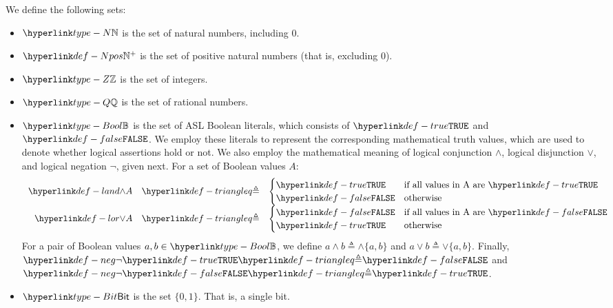 We define the following sets:
\begin{itemize}
\item
\hypertarget{type-N}{}
$\N$
is the set of natural numbers, including $0$.

\item \hypertarget{def-Npos}{
    $\Npos$ is the set of positive natural numbers (that is, excluding $0$).
}

\item
\hypertarget{type-Z}{}
$\Z$
is the set of integers.

\item
\hypertarget{type-Q}{}
$\Q$
is the set of rational numbers.

\hypertarget{def-false}{}
\hypertarget{def-true}{}
\item
\hypertarget{type-Bool}{}
$\Bool$
is the set of ASL Boolean literals, which consists of $\True$ and $\False$.
We employ these literals to represent the corresponding mathematical truth values,
which are used to denote whether logical assertions hold or not.
\hypertarget{def-land}{}
\hypertarget{def-lor}{}
We also employ the mathematical meaning of logical conjunction $\land$, logical disjunction $\lor$,
and logical negation $\neg$, given next.
For a set of Boolean values $A$:
\[
  \begin{array}{rcl}
  \land A &\triangleq&
  \begin{cases}
    \True & \text{if all values in A are }\True\\
    \False & \text{otherwise}
  \end{cases}\\
  \lor A &\triangleq&
  \begin{cases}
    \False & \text{if all values in A are }\False\\
    \True & \text{otherwise}
  \end{cases}\\
\end{array}
\]
\hypertarget{def-neg}{}
For a pair of Boolean values $a,b\in\Bool$, we define $a \land b \triangleq \land\{a, b\}$
and $a \lor b \triangleq \lor\{a, b\}$.
Finally, $\neg\True\triangleq\False$ and $\neg\False\triangleq\True$.

\item
\hypertarget{type-Bit}{}
$\Bit$
is the set $\{0,1\}$. That is, a single bit.


\end{itemize}
